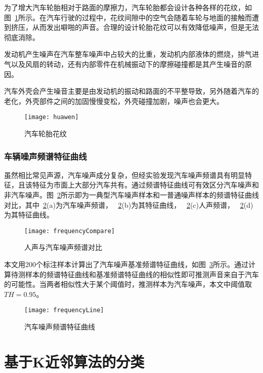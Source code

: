 为了增大汽车轮胎相对于路面的摩擦力，汽车轮胎都会设计各种各样的花纹，如图~\ref{fig:huawen}所示。在汽车行驶的过程中，花纹间隙中的空气会随着车轮与地面的接触而遭到挤压，从而发出噼啪的声音。合理的设计轮胎花纹可以有效降低噪声，但是无法彻底消除。

发动机产生噪声在汽车整车噪声中占较大的比重，发动机内部液体的燃烧，排气进气以及风扇的转动，还有内部零件在机械振动下的摩擦碰撞都是其产生噪音的原因。

汽车外壳会产生噪音主要是由发动机的振动和路面的不平整导致，另外随着汽车的老化，外壳部件之间的加固慢慢变松，外壳碰撞加剧，噪声也会更大。

\begin{figure}[htbp] %
  \centering
  \texttt{[image: huawen]}
  \caption{汽车轮胎花纹}
  \label{fig:huawen}
\end{figure}




\subsubsection{车辆噪声频谱特征曲线}
虽然相比常见声源，汽车噪声成分复杂，但经实验发现汽车噪声频谱具有明显特征，且该特征为市面上大部分汽车共有。通过频谱特征曲线可有效区分汽车噪声和非汽车噪声。图~\ref{fig:frequencyCompare}所示即为一典型汽车噪声样本和一普通噪声样本的频谱特征曲线对比，其中~\ref{fig:frequencyCompare}(a)为汽车噪声频谱， ~\ref{fig:frequencyCompare}(b)为其特征曲线， ~\ref{fig:frequencyCompare}(c)人声频谱， ~\ref{fig:frequencyCompare}(d)为其特征曲线。


\begin{figure}[htbp] %
  \centering
  \texttt{[image: frequencyCompare]}
  \caption{人声与汽车噪声频谱对比}
  \label{fig:frequencyCompare}
\end{figure}

本文用200个标注样本计算出了汽车噪声基准频谱特征曲线，如图~\ref{fig:frequencyLine}所示。通过计算待测样本的频谱特征曲线和基准频谱特征曲线的相似性即可推测声音来自于汽车的可能性。当两者相似性大于某个阈值时，推测样本为汽车噪声，本文中阈值取$TH=0.95$。

\begin{figure}[htbp] %
  \centering
  \texttt{[image: frequencyLine]}
  \caption{汽车噪声频谱特征曲线}
  \label{fig:frequencyLine}
\end{figure}


\section{基于K近邻算法的分类}

